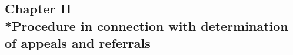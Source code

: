 \documentclass[12pt,a4paper]{article}
\begin{document}
%
%
%

\subsection[Chapter II --- Procedure in connection with determination of appeals and referrals]{Chapter II\\*Procedure in connection with determination of appeals and referrals}

\renewcommand\parthead{--- Part V Chapter II}


%
%
%
\end{document}
